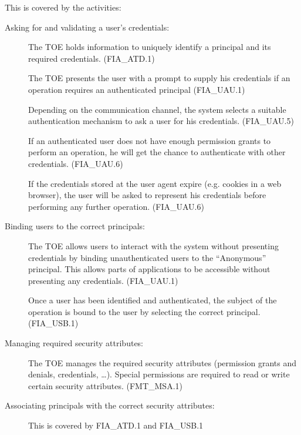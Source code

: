 \documentclass[12pt,english]{scrbook}
\begin{document}
    This is covered by the activities:

    \begin{description}
        \item[Asking for and validating a user's credentials:]

            The TOE holds information to uniquely identify a principal and its
            required credentials. (FIA\_ATD.1) 
            
            The TOE presents the user with a prompt to supply his credentials
            if an operation requires an authenticated principal (FIA\_UAU.1)

            Depending on the communication channel, the system selects a
            suitable authentication mechanism to ask a user for his
            credentials. (FIA\_UAU.5)

            If an authenticated user does not have enough permission grants to
            perform an operation, he will get the chance to authenticate with
            other credentials. (FIA\_UAU.6)

            If the credentials stored at the user agent expire (e.g. cookies in
            a web browser), the user will be asked to represent his credentials
            before performing any further operation. (FIA\_UAU.6)

        \item[Binding users to the correct principals:]

            The TOE allows users to interact with the system without presenting
            credentials by binding unauthenticated users to the ``Anonymous''
            principal. This allows parts of applications to be accessible without
            presenting any credentials. (FIA\_UAU.1)

            Once a user has been identified and authenticated, the subject of
            the operation is bound to the user by selecting the correct
            principal. (FIA\_USB.1)

        \item[Managing required security attributes:]

            The TOE manages the required security attributes (permission grants
            and denials, credentials, \dots). Special permissions are required
            to read or write certain security attributes. (FMT\_MSA.1)

        \item[Associating principals with the correct security attributes:]

            This is covered by FIA\_ATD.1 and FIA\_USB.1

    \end{description}
\end{document}
